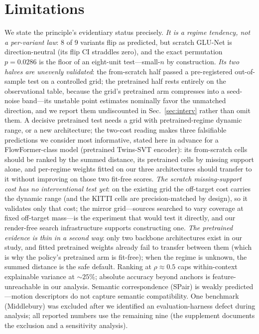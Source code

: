 \documentclass[runningheads]{llncs}
\begin{document}
\section{Limitations}
\label{sec:limits}

We state the principle's evidentiary status precisely. \emph{It is a regime
tendency, not a per-variant law}: 8 of 9 variants flip as predicted, but
scratch GLU-Net is direction-neutral (its flip CI straddles zero), and the
exact permutation $p{=}0.0286$ is the floor of an eight-unit test---small-$n$
by construction. \emph{Its two halves are unevenly validated}: the
from-scratch half passed a pre-registered out-of-sample test on a controlled
grid; the pretrained half rests entirely on the observational table, because
the grid's pretrained arm compresses into a seed-noise band---its unstable
point estimates nominally favor the unmatched direction, and we report them
undiscounted in Sec.~\ref{sec:interv} rather than omit them. A
decisive pretrained test needs a grid with pretrained-regime dynamic range,
or a new architecture; the two-cost reading makes three falsifiable
predictions we consider most informative, stated here in advance for a
FlowFormer-class model (pretrained Twins-SVT encoder): its from-scratch
cells should be ranked by the summed distance, its pretrained cells by
missing support alone, and per-regime weights fitted on our three
architectures should transfer to it without improving on those two fit-free
scores. \emph{The scratch missing-support cost has no interventional test
yet}: on the existing grid the off-target cost carries the dynamic range
(and the KITTI cells are precision-matched by design), so it validates only
that cost; the mirror grid---sources searched to vary coverage at fixed
off-target mass---is the experiment that would test it directly, and our
render-free search infrastructure supports constructing one. \emph{The
pretrained evidence is thin in a second way}: only two backbone
architectures exist in our study, and fitted pretrained weights already
fail to transfer between them (which is why the policy's pretrained arm is
fit-free); when the regime is unknown, the summed distance is the safe
default. Ranking at
$\rho{\approx}0.5$ caps within-context explainable variance at
${\sim}25\%$; absolute accuracy beyond anchors is feature-unreachable in our
analysis. Semantic correspondence (SPair) is weakly predicted---motion
descriptors do not capture semantic compatibility. One benchmark
(Middlebury) was excluded after we identified an evaluation-harness defect
during analysis; all reported numbers use the remaining nine (the supplement
documents the exclusion and a sensitivity analysis).
\end{document}
